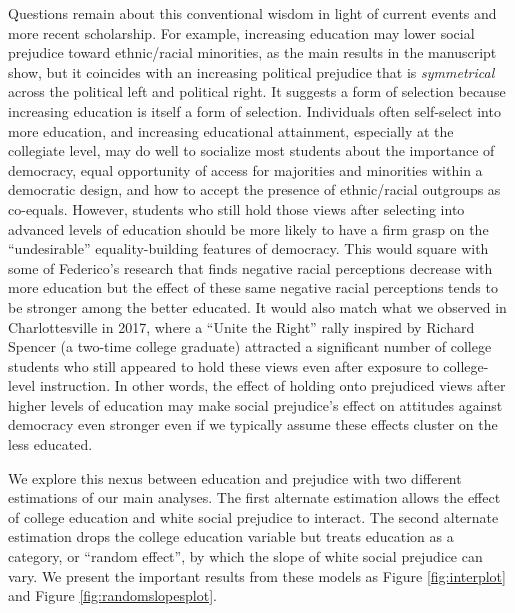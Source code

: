 \documentclass[11pt,]{article}
\begin{document}
Questions remain about this conventional wisdom in light of current
events and more recent scholarship. For example, increasing education
may lower social prejudice toward ethnic/racial minorities, as the main
results in the manuscript show, but it coincides with an increasing
political prejudice \citep{henrynapier2017ergi} that is
\emph{symmetrical} across the political left and political right. It
suggests a form of selection because increasing education is itself a
form of selection. Individuals often self-select into more education,
and increasing educational attainment, especially at the collegiate
level, may do well to socialize most students about the importance of
democracy, equal opportunity of access for majorities and minorities
within a democratic design, and how to accept the presence of
ethnic/racial outgroups as co-equals. However, students who still hold
those views after selecting into advanced levels of education should be
more likely to have a firm grasp on the ``undesirable''
equality-building features of democracy. This would square with some of
Federico's
\citetext{\citeyear{federico2005rper}; \citeyear{federico2006reir}}
research that finds negative racial perceptions decrease with more
education but the effect of these same negative racial perceptions tends
to be stronger among the better educated. It would also match what we
observed in Charlottesville in 2017, where a ``Unite the Right'' rally
inspired by Richard Spencer (a two-time college graduate) attracted a
significant number of college students who still appeared to hold these
views even after exposure to college-level instruction. In other words,
the effect of holding onto prejudiced views after higher levels of
education may make social prejudice's effect on attitudes against
democracy even stronger even if we typically assume these effects
cluster on the less educated.

We explore this nexus between education and prejudice with two different
estimations of our main analyses. The first alternate estimation allows
the effect of college education and white social prejudice to interact.
The second alternate estimation drops the college education variable but
treats education as a category, or ``random effect'', by which the slope
of white social prejudice can vary. We present the important results
from these models as Figure \ref{fig:interplot} and Figure
\ref{fig:randomslopesplot}.
\end{document}
